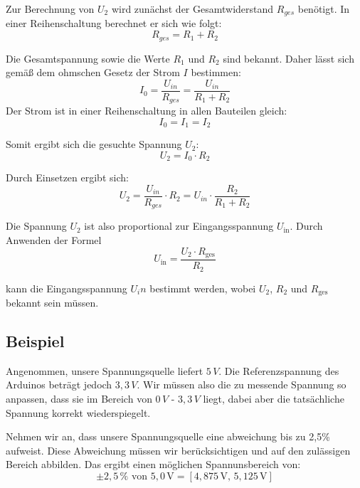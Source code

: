 	Zur Berechnung von \(U_2\) wird zunächst der Gesamtwiderstand \(R_{ges}\) benötigt. In einer Reihenschaltung berechnet er sich wie folgt:
	\begin{equation}
		R_{ges} = R_1 + R_2
	\end{equation}

	Die Gesamtspannung sowie die Werte \(R_1\) und \(R_2\) sind bekannt. Daher lässt sich gemä{\ss} dem ohmschen Gesetz der Strom \(I\) bestimmen:
	\begin{equation}
		I_0 = \frac{U_{in}}{R_{ges}} = \frac{U_{in}}{R_1 + R_2}
	\end{equation}
	Der Strom ist in einer Reihenschaltung in allen Bauteilen gleich:
	\begin{equation}
		I_0 = I_1 = I_2
	\end{equation}

	Somit ergibt sich die gesuchte Spannung \(U_2\):
	\begin{equation}
		U_2 = I_0 \cdot R_2
	\end{equation}

	Durch Einsetzen ergibt sich:
	\begin{equation}
		U_2 = \frac{U_{in}}{R_{ges}} \cdot R_2  = U_{in} \cdot \frac{R_2}{R_1 + R_2}
		\label{voltageDivider:formula}
	\end{equation}

	
	Die Spannung \(U_2\) ist also proportional zur Eingangsspannung \(U_\text{in}\). Durch Anwenden der Formel
	\begin{equation}
		U_\text{in} = \frac{U_2 \cdot R_\text{ges}}{R_2}
	\end{equation}

	kann die Eingangsspannung \(U_in\) bestimmt werden, wobei \(U_2\), \(R_2\) und \(R_\text{ges}\) bekannt sein müssen.
	
	
	\subsection{Beispiel\label{voltageDivider:example}}
	Angenommen, unsere Spannungsquelle liefert \(5\,V\). Die Referenzspannung des Arduinos beträgt jedoch \(3,3\,V\). Wir müssen also die zu messende Spannung so anpassen, dass sie im Bereich von \(0\,V\) - \(3,3\,V\) liegt, dabei aber die tatsächliche Spannung korrekt wiederspiegelt. 
	
	Nehmen wir an, dass unsere Spannungsquelle eine abweichung bis zu 2,5\% aufweist. Diese Abweichung müssen wir berücksichtigen und auf den zulässigen Bereich abbilden. Das ergibt einen möglichen Spannunsbereich von:
	\[
	\pm 2{,}5\,\% \text{ von } 5{,}0\,\mathrm{V} = [4{,}875\,\mathrm{V},\,5{,}125\,\mathrm{V}]
	\]
	
